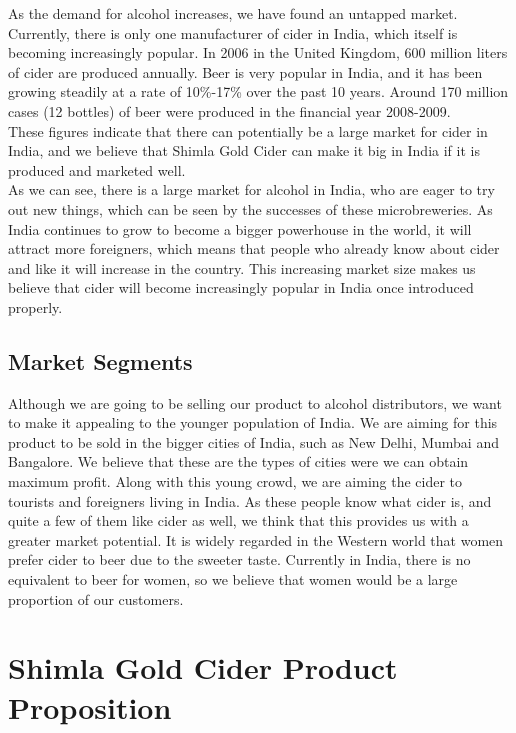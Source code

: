 \documentclass[11pt]{article}
\begin{document}
As the demand for alcohol increases, we have found an untapped market. Currently, there is only one manufacturer of cider in India, which itself is becoming increasingly popular. In 2006 in the United Kingdom, 600 million liters of cider are produced annually. Beer is very popular in India, and it has been growing steadily at a rate of 10\%-17\% over the past 10 years. Around 170 million cases (12 bottles) of beer were produced in the financial year 2008-2009. \\

These figures indicate that there can potentially be a large market for cider in India, and we believe that Shimla Gold Cider can make it big in India if it is produced and marketed well. \\

As we can see, there is a large market for alcohol in India, who are eager to try out new things, which can be seen by the successes of these microbreweries. As India continues to grow to become a bigger powerhouse in the world, it will attract more foreigners, which means that people who already know about cider and like it will increase in the country. This increasing market size makes us believe that cider will become increasingly popular in India once introduced properly.

  \subsection{Market Segments}
 Although we are going to be selling our product to alcohol distributors,
we want to make it appealing to the younger population of India. We are aiming
for this product to be sold in the bigger cities of India, such as New Delhi,
Mumbai and Bangalore. We believe that these are the types of cities were we can
obtain maximum profit.
Along with this young crowd, we are aiming the cider to tourists and foreigners
living in India. As these people know what cider is, and quite a few of them
like cider as well, we think that this provides us with a greater market
potential.
It is widely regarded in the Western world that women prefer cider to beer due
to the sweeter taste. Currently in India, there is no equivalent to beer for
women, so we believe that women would be a large proportion of our customers.

\newpage
\section{Shimla Gold Cider Product Proposition}
\end{document}

